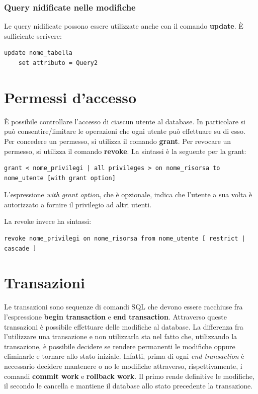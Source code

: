 \documentclass[\main/main.tex]{subfiles}
\begin{document}
\subsubsection{Query nidificate nelle modifiche}
Le query nidificate possono essere utilizzate anche con il comando \textbf{update}.
È sufficiente scrivere:
\begin{verbatim}
update nome_tabella
    set attributo = Query2
\end{verbatim}

\section{Permessi d'accesso}
È possibile controllare l'accesso di ciascun utente al database. In particolare si può consentire/limitare le operazioni che ogni utente può effettuare su di esso.
Per concedere un permesso, si utilizza il comando \textbf{grant}. Per revocare un permesso, si utilizza il comando \textbf{revoke}.
La sintassi è la seguente per la grant:
\begin{verbatim}
grant < nome_privilegi | all privileges > on nome_risorsa to nome_utente [with grant option]
  \end{verbatim}
L'espressione \textit{with grant option}, che è opzionale, indica che l'utente a sua volta è autorizzato a fornire il privilegio ad altri utenti.

La revoke invece ha sintassi:
\begin{verbatim}
revoke nome_privilegi on nome_risorsa from nome_utente [ restrict | cascade ]
\end{verbatim}

\section{Transazioni}
Le transazioni sono sequenze di comandi SQL che devono essere racchiuse fra l'espressione \textbf{begin transaction} e \textbf{end transaction}. Attraverso queste transazioni è possibile effettuare delle modifiche al database.
La differenza fra l'utilizzare una transazione e non utilizzarla sta nel fatto che, utilizzando la transazione, è possibile decidere se rendere permanenti le modifiche oppure eliminarle e tornare allo stato iniziale.
Infatti, prima di ogni \textit{end transaction} è necessario decidere mantenere o no le modifiche attraverso, rispettivamente, i comandi \textbf{commit work} e \textbf{rollback work}. Il primo rende definitive le modifiche, il secondo le cancella e mantiene il database allo stato precedente la transazione.
\end{document}
